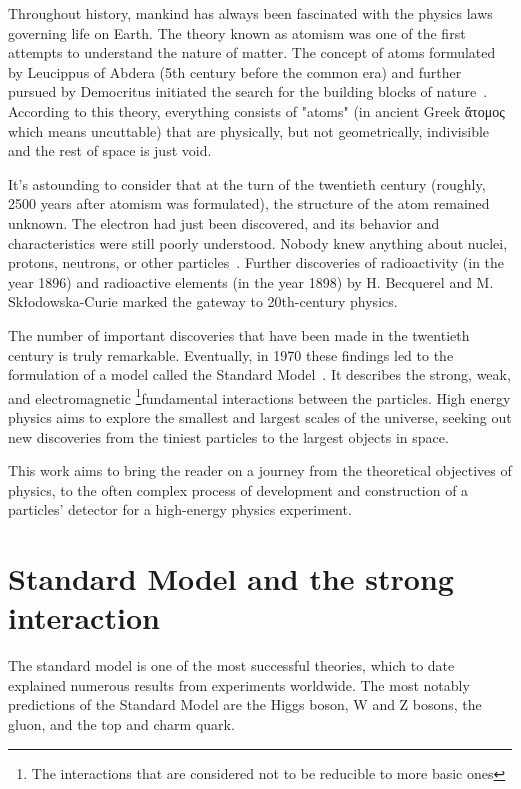 Throughout history, mankind has always been fascinated with the physics laws governing life on Earth. The theory known as atomism was one of the first attempts to understand the nature of matter. The concept of atoms formulated by Leucippus of Abdera (5th century before the common era) and further pursued by Democritus initiated the search for the building blocks of nature~\cite{sep-atomism-ancient}. According to this theory, everything consists of "atoms" (in ancient Greek \foreignlanguage{greek}{ἄτομος} which means uncuttable) that are physically, but not geometrically, indivisible and the rest of space is just void. 

It's astounding to consider that at the turn of the twentieth century (roughly, 2500 years after atomism was formulated), the structure of the atom remained unknown. The electron had just been discovered, and its behavior and characteristics were still poorly understood. Nobody knew anything about nuclei, protons, neutrons, or other particles~\cite{intro_particle_physics}. 
Further discoveries of radioactivity (in the year 1896) and radioactive elements (in the year 1898) by H. Becquerel and M. Skłodowska-Curie marked the gateway to 20th-century physics. 

The number of important discoveries that have been made in the twentieth century is truly remarkable. Eventually, in 1970 these findings led to the formulation of a model called the Standard Model~\cite{intro_particle_physics}. It describes the strong, weak, and electromagnetic \footnote{The interactions that are considered not to be reducible to more basic ones}{fundamental interactions} between the particles. 
 High energy physics aims to explore the smallest and largest scales of the universe, seeking out new discoveries from the tiniest particles to the largest objects in space.
 
 This work aims to bring the reader on a journey from the theoretical objectives of physics, to the often complex process of development and construction of a particles' detector for a high-energy physics experiment.
 
\section{Standard Model and the strong interaction}

The standard model is one of the most successful theories, which to date explained numerous results from experiments worldwide. The most notably predictions of the Standard Model are the Higgs boson, W and Z bosons, the gluon, and the top and charm quark.

